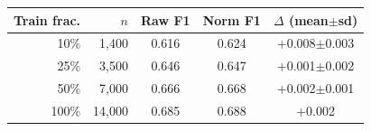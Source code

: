 \begin{tabular}{rrccc}
\toprule
Train frac. & $n$ & Raw F1 & Norm F1 & $\Delta$ (mean$\pm$sd)\\
\midrule
10\% & 1,400 & 0.616 & 0.624 & +0.008$\pm$0.003\\
25\% & 3,500 & 0.646 & 0.647 & +0.001$\pm$0.002\\
50\% & 7,000 & 0.666 & 0.668 & +0.002$\pm$0.001\\
100\% & 14,000 & 0.685 & 0.688 & +0.002\\
\bottomrule
\end{tabular}
